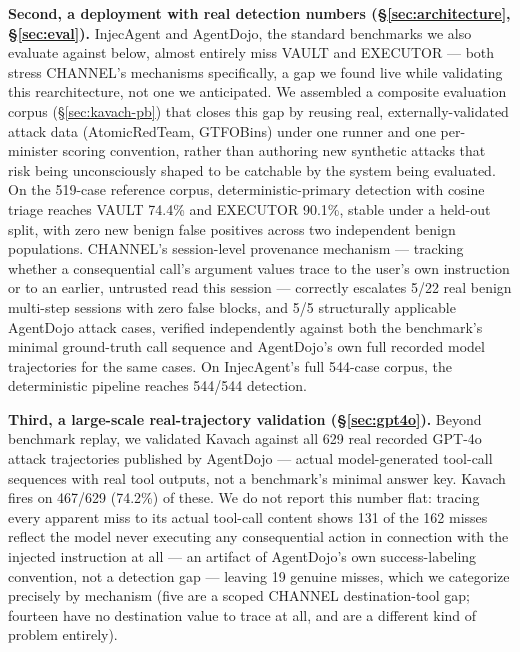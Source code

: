 \documentclass[sigconf,anonymous,review]{acmart}
\begin{document}
\textbf{Second, a deployment with real detection numbers
(\S\ref{sec:architecture}, \S\ref{sec:eval}).} InjecAgent and AgentDojo, the
standard benchmarks we also evaluate against below, almost entirely miss
VAULT and EXECUTOR --- both stress CHANNEL's mechanisms specifically, a gap
we found live while validating this rearchitecture, not one we anticipated.
We assembled a composite evaluation corpus (\S\ref{sec:kavach-pb}) that closes
this gap by reusing real, externally-validated attack data (AtomicRedTeam,
GTFOBins) under one runner and one per-minister scoring convention, rather
than authoring new synthetic attacks that risk being unconsciously shaped to
be catchable by the system being evaluated. On the 519-case
reference corpus, deterministic-primary detection with cosine triage reaches
VAULT 74.4\% and EXECUTOR 90.1\%, stable under a held-out split, with zero
new benign false positives across two independent benign populations.
CHANNEL's
session-level provenance mechanism --- tracking whether a consequential
call's argument values trace to the user's own instruction or to an
earlier, untrusted read this session --- correctly escalates 5/22 real
benign multi-step sessions with zero false blocks, and 5/5 structurally
applicable AgentDojo attack cases, verified independently against both the
benchmark's minimal ground-truth call sequence and AgentDojo's own full
recorded model trajectories for the same cases. On InjecAgent's full 544-case
corpus, the deterministic pipeline reaches 544/544 detection.

\textbf{Third, a large-scale real-trajectory validation
(\S\ref{sec:gpt4o}).} Beyond benchmark replay, we validated Kavach against
all 629 real recorded GPT-4o attack trajectories published by AgentDojo ---
actual model-generated tool-call sequences with real tool outputs, not a
benchmark's minimal answer key. Kavach fires on 467/629 (74.2\%) of these.
We do not report this number flat: tracing every apparent miss to its actual
tool-call content shows 131 of the 162 misses reflect the model never
executing any consequential action in connection with the injected
instruction at all --- an artifact of AgentDojo's own success-labeling
convention, not a detection gap --- leaving 19 genuine misses, which we
categorize precisely by mechanism (five are a scoped CHANNEL destination-tool
gap; fourteen have no destination value to trace at all, and are a different
kind of problem entirely).
\end{document}
